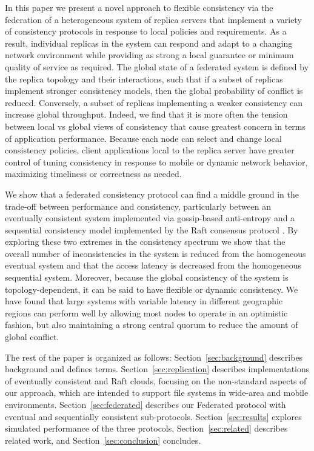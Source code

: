 \documentclass[10pt,conference,letterpaper]{IEEEtran}
\begin{document}
In this paper we present a novel approach to flexible consistency via the federation of a
heterogeneous system of replica servers that implement a variety of consistency protocols
in response to local policies and requirements.
As a result, individual replicas in the system can respond and adapt to a changing network
environment while providing as strong a local guarantee or minimum quality of service as
required.
The global state of a federated system is defined by the replica topology and their
interactions, such that if a subset of replicas implement stronger consistency models,
then the global probability of conflict is reduced.
Conversely, a subset of replicas implementing a weaker consistency can increase global
throughput.
Indeed, we find that it is more often the tension between local vs global views of
consistency that cause greatest concern in terms of application performance.
Because each node can select and change local consistency policies, client applications
local to the replica server have greater control of tuning consistency in response to
mobile or dynamic network behavior, maximizing timeliness or correctness as needed.

We show that a federated consistency protocol can find a middle ground in the trade-off
between performance and consistency, particularly between an eventually consistent system
implemented via gossip-based anti-entropy \cite{kempe_gossip-based_2003} and a sequential
consistency model implemented by the Raft consensus protocol \cite{ongaro_search_2014}.
By exploring these two extremes in the consistency spectrum we show that the overall
number of inconsistencies in the system is reduced from the homogeneous eventual system and
that the access latency is decreased from the homogeneous sequential system.
Moreover, because the global consistency of the system is topology-dependent, it can be
said to have flexible or dynamic consistency.
We have found that large systems with variable latency in different geographic regions can
perform well by allowing most nodes to operate in an optimistic fashion, but also maintaining a
strong central quorum to reduce the amount of global conflict.

The rest of the paper is organized as follows: Section~\ref{sec:background}
describes background and defines terms. Section~\ref{sec:replication}
describes implementations of eventually consistent and Raft clouds, focusing on
the non-standard aspects of our approach, which are intended to support
file systems in wide-area and mobile environments.
Section~\ref{sec:federated} describes our Federated protocol with eventual and
sequentially consistent sub-protocols.
Section~\ref{sec:results} explores simulated performance of the three
protocols, Section~\ref{sec:related} describes related work, and Section~\ref{sec:conclusion} concludes.
\end{document}

